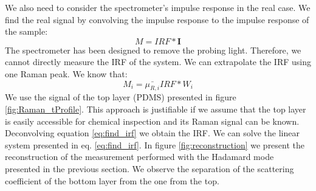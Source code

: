 \documentclass{osa-article}
\begin{document}
We also need to consider the spectrometer's impulse response in the real case. We find the real signal by convolving the impulse response to the impulse response of the sample:
\begin{equation}
M = IRF * \textbf{I}
\end{equation}
 The spectrometer has been designed to remove the probing light. Therefore, we cannot directly measure the IRF of the system. We can extrapolate the IRF using one Raman peak. We know that:
\begin{equation}
M_i =  \bar{\mu_{R,i}} IRF * W_i 
\label{eq:find_irf}
\end{equation}
We use the signal of the top layer (PDMS) presented in figure \ref{fig:Raman_tProfile}. This approach is justifiable if we assume that the top layer is easily accessible for chemical inspection and its Raman signal can be known.
Deconvolving equation \ref{eq:find_irf} we obtain the IRF.
We can solve the linear system presented in eq. \ref{eq:find_irf}.
In figure \ref{fig:reconstruction} we present the reconstruction of the measurement performed with the Hadamard mode presented in the previous section.
We observe the separation of the scattering coefficient of the bottom layer from the one from the top.
\end{document}
